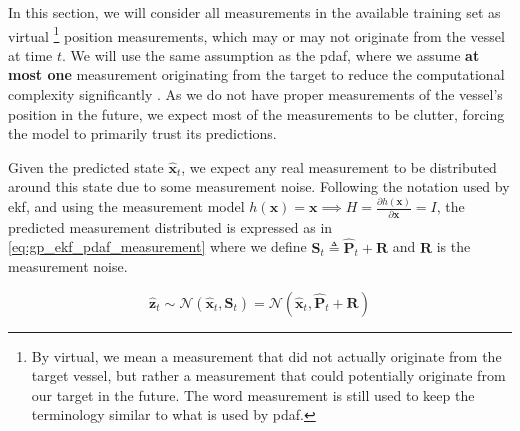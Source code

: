 In this section, we will consider all measurements in the available training set as virtual \footnote{By virtual, we mean a measurement that did not actually originate from the target vessel, but rather a measurement that could potentially originate from our target in the future. The word measurement is still used to keep the terminology similar to what is used by \acrshort{pdaf}.} position measurements, which may or may not originate from the vessel at time $t$. We will use the same assumption as the \acrshort{pdaf}, where we assume \textbf{at most one} measurement originating from the target to reduce the computational complexity significantly \cite{sensorfusjon}. As we do not have proper measurements of the vessel's position in the future, we expect most of the measurements to be clutter, forcing the model to primarily trust its predictions. 

Given the predicted state $\hat{\boldsymbol{x}}_t$, we expect any real measurement to be distributed around this state due to some measurement noise. Following the notation used by \acrshort{ekf}, and using the measurement model $h(\boldsymbol{x}) = \boldsymbol{x} \implies H = \frac{\partial h (\boldsymbol{x})}{\partial \boldsymbol{x}} = I$, the predicted measurement distributed is expressed as in \cref{eq:gp_ekf_pdaf_measurement} where we define $\boldsymbol{S}_t \triangleq \hat{\boldsymbol{P}}_t + \boldsymbol{R}$ and $\boldsymbol{R}$ is the measurement noise.

\begin{equation} \label{eq:gp_ekf_pdaf_measurement}
    \hat{\boldsymbol{z}}_t \sim \mathcal{N}(\hat{\boldsymbol{x}}_t, \boldsymbol{S}_{t}) = \mathcal{N}(\hat{\boldsymbol{x}}_t, \hat{\boldsymbol{P}}_t + \boldsymbol{R})
\end{equation}

